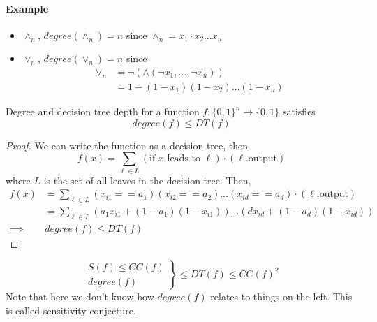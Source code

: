 \paragraph{Example}
\begin{itemize}
	\item $\land_n$, $degree(\land_n) = n$ since $\land_n = x_1 \cdot x_2 \dots x_n$
	\item $\lor_n$, $degree(\lor_n) = n$ since 
		\begin{align}
			\lor_n 
			&= \neg( \land ( \neg x_1, \dots, \neg x_n )) \\
			&= 1 - (1 - x_1) (1 - x_2 ) \dots (1 - x_n)
		\end{align}
\end{itemize}

\begin{proposition}
	Degree and decision tree depth for a function $f: \{0 ,1 \}^ n \rightarrow \{ 0 , 1\}$ satisfies
	\begin{equation}
		degree(f) \leq DT(f)
	\end{equation}	
\end{proposition}
\begin{proof}
	We can write the function as a decision tree, then
	\begin{equation}
		f(x) = \sum_{\ell \in L} (\text{if $x$ leads to } \ell) \cdot (\ell\text{.output})
	\end{equation}
	where $L$ is the set of all leaves in the decision tree. Then, 
	\begin{align}
		f(x) 
		&= \sum_{\ell \in L} (x_{i1} == a_1) (x_{i2} == a_2) \dots (x_{id} == a_d) \cdot (\ell \text{.output} ) \\
		&= \sum_{\ell \in L} \left(a_1 x_{i1} + (1 - a_1) (1 - x_{i1})\right) \dots \left(d x_{id} + ( 1 - a_d) (1 - x_{id})\right)\\
	    \implies & degree(f) \leq DT(f)
	\end{align}
\end{proof}

\begin{proposition} 
	[Summary]
	\begin{equation}
		\left.
		\begin{aligned}
			 S(f) \leq CC(f) \\
			 degree(f)
		\end{aligned} \right\}
		\leq DT(f) \leq CC(f)^2
	\end{equation}
	Note that here we don't know how $degree(f)$ relates to things on the left. This is called sensitivity conjecture. 	
\end{proposition}

